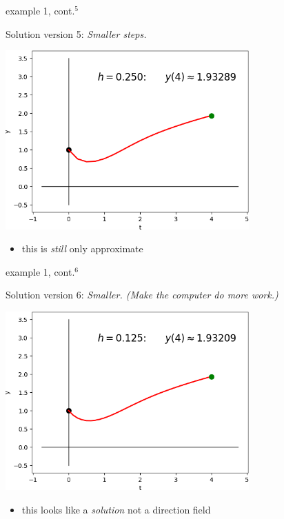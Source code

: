 \documentclass{beamer}
\begin{document}
\begin{frame}{example 1, cont.$^5$}

Solution version 5: \emph{Smaller steps.}

\bigskip
\hfill \includegraphics[width=0.7\textwidth]{figs/sequence-5}

\begin{itemize}
\item this is \emph{still} only approximate
\end{itemize}
\end{frame}


\begin{frame}{example 1, cont.$^6$}

Solution version 6: \emph{Smaller.  (Make the computer do more work.)}

\bigskip
\hfill \includegraphics[width=0.7\textwidth]{figs/sequence-6}

\begin{itemize}
\item this looks like a \emph{solution} not a direction field 
\end{itemize}
\end{frame}
\end{document}
